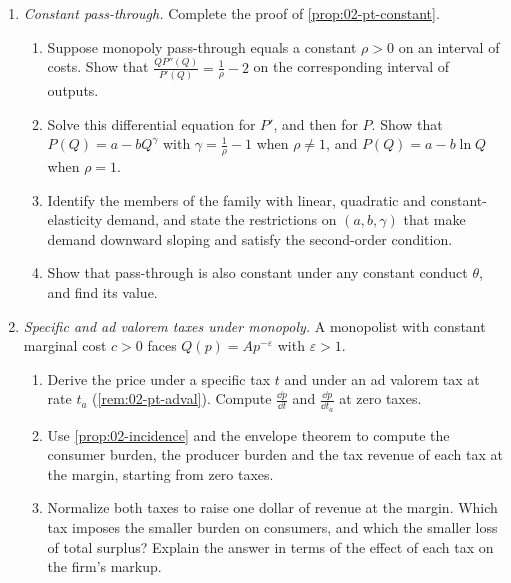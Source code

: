 \begin{enumerate}[label=\arabic*., leftmargin=*, itemsep=6pt]
\item \textit{Constant pass-through.} Complete the proof of \cref{prop:02-pt-constant}.
\begin{enumerate}[label=(\alph*)]
  \item Suppose monopoly pass-through equals a constant $\rho > 0$ on an interval of costs. Show that
  $\frac{QP''(Q)}{P'(Q)} = \frac{1}{\rho} - 2$ on the corresponding interval of outputs.
  \item Solve this differential equation for $P'$, and then for $P$. Show that $P(Q) = a - bQ^{\gamma}$ with
  $\gamma = \frac{1}{\rho} - 1$ when $\rho \ne 1$, and $P(Q) = a - b\ln Q$ when $\rho = 1$.
  \item Identify the members of the family with linear, quadratic and constant-elasticity demand, and state the
  restrictions on $(a, b, \gamma)$ that make demand downward sloping and satisfy the second-order condition.
  \item Show that pass-through is also constant under any constant conduct $\theta$, and find its value.
\end{enumerate}

\item \textit{Specific and ad valorem taxes under monopoly.} A monopolist with constant marginal cost $c > 0$ faces
$Q(p) = Ap^{-\varepsilon}$ with $\varepsilon > 1$.
\begin{enumerate}[label=(\alph*)]
  \item Derive the price under a specific tax $t$ and under an ad valorem tax at rate $t_a$ (\cref{rem:02-pt-adval}).
  Compute $\frac{\dd p}{\dd t}$ and $\frac{\dd p}{\dd t_a}$ at zero taxes.
  \item Use \cref{prop:02-incidence} and the envelope theorem to compute the consumer burden, the producer burden and
  the tax revenue of each tax at the margin, starting from zero taxes.
  \item Normalize both taxes to raise one dollar of revenue at the margin. Which tax imposes the smaller burden on
  consumers, and which the smaller loss of total surplus? Explain the answer in terms of the effect of each tax on
  the firm's markup.
\end{enumerate}


\end{enumerate}
